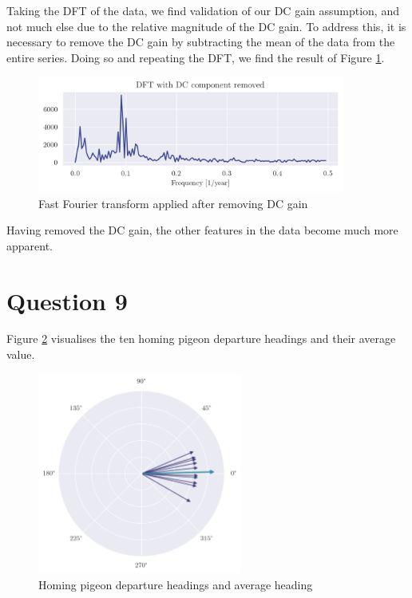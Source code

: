 \documentclass[a4paper, 11pt]{article}
\begin{document}
Taking the DFT of the data, we find validation of our DC gain assumption, and
not much else due to the relative magnitude of the DC gain. To address this, it
is necessary to remove the DC gain by subtracting the mean of the data from the
entire series. Doing so and repeating the DFT, we find the result of Figure
\ref{fig:q8_nodcdft}.

\newpage

\begin{figure}[ht]
    \centering
    \includegraphics[width=0.9\textwidth]{images/q8_nodcdft.png}
    \caption{Fast Fourier transform applied after removing DC gain}
    \label{fig:q8_nodcdft}
\end{figure}

Having removed the DC gain, the other features in the data become much more
apparent.

\newpage
\section*{Question 9}

Figure \ref{fig:q9_headings} visualises the ten homing pigeon departure headings
and their average value.

\begin{figure}[ht]
    \centering
    \includegraphics[width=0.6\textwidth]{images/q9_headings.png}
    \caption{Homing pigeon departure headings and average heading}
    \label{fig:q9_headings}
\end{figure}
\end{document}
